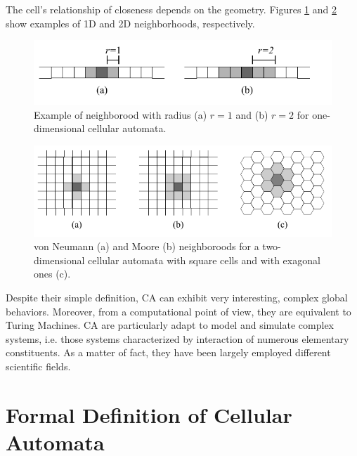 The cell's relationship of closeness depends on the geometry. Figures
\ref{fig:1Dneighborhood} and \ref{fig:2Dneighborhood} show examples of
1D and 2D neighborhoods, respectively.

\begin{figure}
  \begin{center}
    \includegraphics[width=12cm]{./images/CellularAutomata/onedimensional.pdf}
    \caption{Example of neighborood with radius (a) $r
      = 1$ and (b) $r = 2$ for one-dimensional cellular automata.}
    \label{fig:1Dneighborhood}
  \end{center}
\end{figure}



\begin{figure}
  \begin{center}
    \includegraphics[width=12cm]{./images/CellularAutomata/twodimensional.pdf}
    \caption{von Neumann (a) and Moore (b) neighboroods for a
      two-dimensional cellular automata with square cells and with
      exagonal ones (c).}
    \label{fig:2Dneighborhood}
  \end{center}
\end{figure}


Despite their simple definition, CA can exhibit very interesting,
complex global behaviors. Moreover, from a computational point of
view, they are equivalent to Turing Machines. CA are particularly
adapt to model and simulate complex systems, i.e. those systems
characterized by interaction of numerous elementary constituents. As a
matter of fact, they have been largely employed different scientific fields.

\section{Formal Definition of Cellular Automata}

